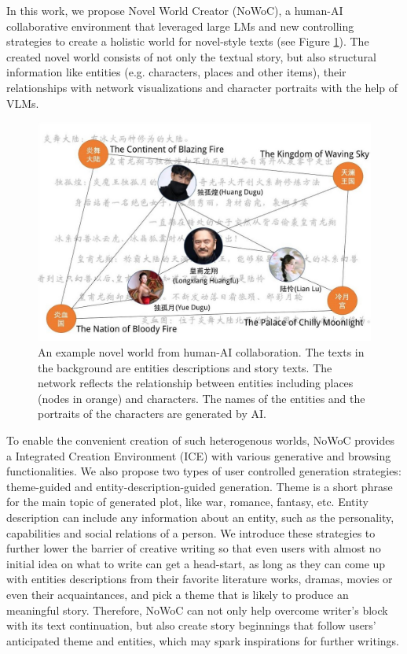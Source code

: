 \documentclass{article}
\begin{document}
In this work, we propose Novel World Creator (NoWoC), a human-AI collaborative environment that leveraged large LMs and new controlling strategies to create a holistic world for novel-style texts (see Figure \ref{fig:world_illustration}). The created novel world consists of not only the textual story, but also structural information like entities (e.g. characters, places and other items), their relationships with network visualizations and character portraits with the help of VLMs. 

\begin{figure}[t]
    \centering
    \includegraphics[width=0.98\columnwidth]{figures/english_translation1.jpg}
    \caption{An example novel world from human-AI collaboration. The texts in the background are entities descriptions and story texts. The network reflects the relationship between entities including places (nodes in orange) and characters. The names of the entities and the portraits of the characters are generated by AI.}
    \label{fig:world_illustration}
\end{figure}

To enable the convenient creation of such heterogenous worlds, NoWoC provides a Integrated Creation Environment (ICE) with various generative and browsing functionalities. We also propose two types of user controlled generation strategies: 
theme-guided and entity-description-guided generation. 
Theme is a short phrase for the main topic of generated plot, like war, romance, 
fantasy, etc. 
Entity description can include any information about an entity, 
such as the personality, capabilities and social relations of a person. 
We introduce these strategies to further lower the barrier of creative writing 
so that even users with almost no initial idea on what to write can get a head-start, 
as long as they can come up with entities descriptions from their favorite 
literature works, dramas, movies or even their acquaintances, and pick a theme 
that is likely to produce an meaningful story. Therefore, NoWoC can not only 
help overcome writer's block with its text continuation, 
but also create story beginnings that follow users' anticipated theme 
and entities, which may spark inspirations for further writings.
\end{document}
